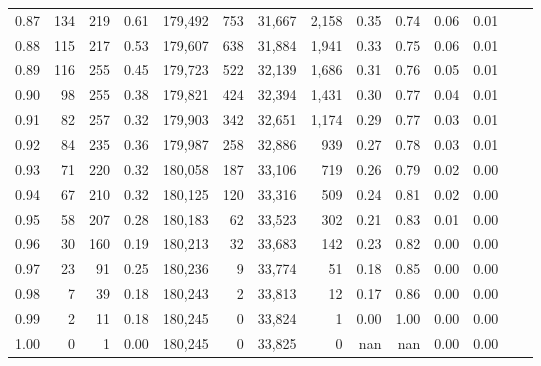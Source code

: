 \begin{tabular}{rrrrrrrrrrrrrr}
0.87 &    134 &  219 &    0.61 &  179,492 &      753 &  31,667 &   2,158 &  0.35 &  0.74 &  0.06 &      0.01 \\
0.88 &    115 &  217 &    0.53 &  179,607 &      638 &  31,884 &   1,941 &  0.33 &  0.75 &  0.06 &      0.01 \\
0.89 &    116 &  255 &    0.45 &  179,723 &      522 &  32,139 &   1,686 &  0.31 &  0.76 &  0.05 &      0.01 \\
0.90 &     98 &  255 &    0.38 &  179,821 &      424 &  32,394 &   1,431 &  0.30 &  0.77 &  0.04 &      0.01 \\
0.91 &     82 &  257 &    0.32 &  179,903 &      342 &  32,651 &   1,174 &  0.29 &  0.77 &  0.03 &      0.01 \\
0.92 &     84 &  235 &    0.36 &  179,987 &      258 &  32,886 &     939 &  0.27 &  0.78 &  0.03 &      0.01 \\
0.93 &     71 &  220 &    0.32 &  180,058 &      187 &  33,106 &     719 &  0.26 &  0.79 &  0.02 &      0.00 \\
0.94 &     67 &  210 &    0.32 &  180,125 &      120 &  33,316 &     509 &  0.24 &  0.81 &  0.02 &      0.00 \\
0.95 &     58 &  207 &    0.28 &  180,183 &       62 &  33,523 &     302 &  0.21 &  0.83 &  0.01 &      0.00 \\
0.96 &     30 &  160 &    0.19 &  180,213 &       32 &  33,683 &     142 &  0.23 &  0.82 &  0.00 &      0.00 \\
0.97 &     23 &   91 &    0.25 &  180,236 &        9 &  33,774 &      51 &  0.18 &  0.85 &  0.00 &      0.00 \\
0.98 &      7 &   39 &    0.18 &  180,243 &        2 &  33,813 &      12 &  0.17 &  0.86 &  0.00 &      0.00 \\
0.99 &      2 &   11 &    0.18 &  180,245 &        0 &  33,824 &       1 &  0.00 &  1.00 &  0.00 &      0.00 \\
1.00 &      0 &    1 &    0.00 &  180,245 &        0 &  33,825 &       0 &   nan &   nan &  0.00 &      0.00 \\
\bottomrule
\end{tabular}
